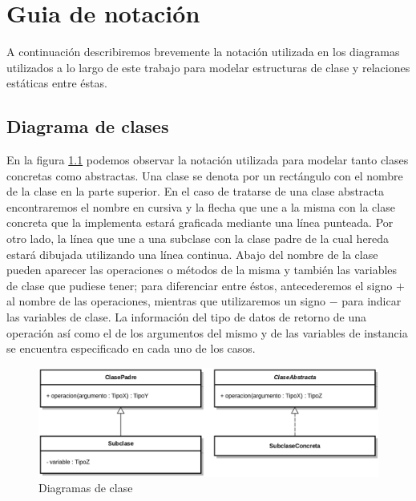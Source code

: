 \chapter{Guia de notación}
\label{ape:notacion}

A continuación describiremos brevemente la notación utilizada en los diagramas utilizados a lo largo de este trabajo para modelar estructuras de clase y relaciones estáticas entre éstas.

\section{Diagrama de clases}

En la figura \ref{fig:png_arquitectura} podemos observar la notación utilizada para modelar tanto clases concretas como abstractas. Una clase se denota por un rectángulo con el nombre de la clase en la parte superior. En el caso de tratarse de una clase abstracta encontraremos el nombre en cursiva y la flecha que une a la misma con la clase concreta que la implementa estará graficada mediante una línea punteada. Por otro lado, la línea que une a una subclase con la clase padre de la cual hereda estará dibujada utilizando una línea continua. Abajo del nombre de la clase pueden aparecer las operaciones o métodos de la misma y también las variables de clase que pudiese tener; para diferenciar entre éstos, antecederemos el signo $+$ al nombre de las operaciones, mientras que utilizaremos un signo $-$ para indicar las variables de clase. La información del tipo de datos de retorno de una operación así como el de los argumentos del mismo y de las variables de instancia se encuentra especificado en cada uno de los casos. 

\begin{figure}[H]
  	\centering
	\includegraphics[scale=0.17]{img/ref_clases.png}
	\caption{Diagramas de clase}
  	\label{fig:png_arquitectura}
\end{figure}

